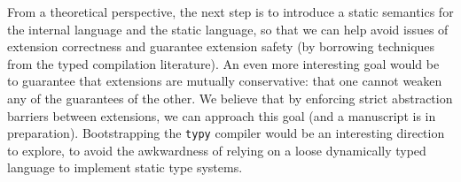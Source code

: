 \documentclass{sigplanconf}
\begin{document}
From a theoretical perspective, the next step is to introduce a static semantics for the internal language and the static language, so that we can help avoid issues of extension correctness and guarantee extension safety (by borrowing techniques from the typed compilation literature). An even more interesting goal would be to guarantee that extensions are mutually conservative: that one cannot weaken any of the guarantees of the other. We believe that by enforcing strict abstraction barriers between extensions, we can approach this goal (and a manuscript is in preparation). Bootstrapping the \texttt{typy} compiler would be an interesting direction to explore, to avoid the awkwardness of relying on a loose dynamically typed language to implement static type systems.
% 
\end{document}
